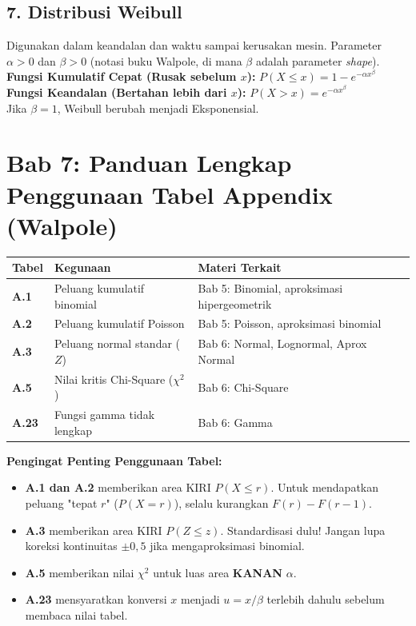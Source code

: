 \documentclass[12pt, a4paper]{article}
\begin{document}
\subsection{7. Distribusi Weibull}
Digunakan dalam keandalan dan waktu sampai kerusakan mesin. Parameter $\alpha > 0$ dan $\beta > 0$ (notasi buku Walpole, di mana $\beta$ adalah parameter \textit{shape}). \\
\textbf{Fungsi Kumulatif Cepat (Rusak sebelum $x$):} $P(X \le x) = 1 - e^{-\alpha x^\beta}$ \\
\textbf{Fungsi Keandalan (Bertahan lebih dari $x$):} $P(X > x) = e^{-\alpha x^\beta}$ \\
Jika $\beta = 1$, Weibull berubah menjadi Eksponensial.

\newpage
\section{Bab 7: Panduan Lengkap Penggunaan Tabel Appendix (Walpole)}

\begin{table}[h!]
\centering
\begin{tabular}{|l|l|l|}
\hline
\textbf{Tabel} & \textbf{Kegunaan} & \textbf{Materi Terkait} \\ \hline
\textbf{A.1} & Peluang kumulatif binomial & Bab 5: Binomial, aproksimasi hipergeometrik \\ \hline
\textbf{A.2} & Peluang kumulatif Poisson & Bab 5: Poisson, aproksimasi binomial \\ \hline
\textbf{A.3} & Peluang normal standar ($Z$) & Bab 6: Normal, Lognormal, Aprox Normal \\ \hline
\textbf{A.5} & Nilai kritis Chi-Square ($\chi^2$) & Bab 6: Chi-Square \\ \hline
\textbf{A.23} & Fungsi gamma tidak lengkap & Bab 6: Gamma \\ \hline
\end{tabular}
\end{table}

\textbf{Pengingat Penting Penggunaan Tabel:}
\begin{itemize}
    \item \textbf{A.1 dan A.2} memberikan area KIRI $P(X \le r)$. Untuk mendapatkan peluang "tepat $r$" ($P(X=r)$), selalu kurangkan $F(r) - F(r-1)$.
    \item \textbf{A.3} memberikan area KIRI $P(Z \le z)$. Standardisasi dulu! Jangan lupa koreksi kontinuitas $\pm 0{,}5$ jika mengaproksimasi binomial.
    \item \textbf{A.5} memberikan nilai $\chi^2$ untuk luas area \textbf{KANAN} $\alpha$.
    \item \textbf{A.23} mensyaratkan konversi $x$ menjadi $u = x/\beta$ terlebih dahulu sebelum membaca nilai tabel.
\end{itemize}
\end{document}

